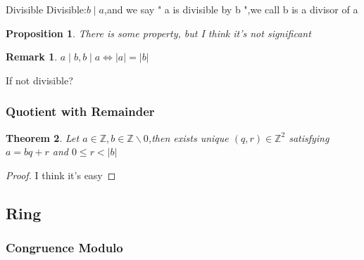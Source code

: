 \documentclass[13pt, a4paper, oneside]{book}
\newtheorem{theorem}{Theorem}[section]
\newtheorem{pro}[theorem]{Proposition}
\newtheorem{remark}{Remark}[section]
\begin{document}
	\begin{definition}{Divisible}{}
		Divisible:$b \mid a$,and we say " a is divisible by b ",we call b is a divisor of a
	\end{definition}
	
	\begin{pro}
		There is some property, but I think it's not significant
	\end{pro}
	
	\begin{remark}
		$a \mid b, b \mid a \Longleftrightarrow \left| a \right| = \left| b \right|$
	\end{remark}
	If not divisible?
	
	\subsubsection{Quotient with Remainder}
	
	\begin{theorem}
		Let $a \in \mathbb{Z}, b \in \mathbb{Z} \backslash {0}$,then exists unique $(q,r) \in \mathbb{Z}^2$ satisfying $a = bq+r$ and $0 \leq r < \left|b\right|$
	\end{theorem}
	
	\begin{proof}
		I think it's easy
	\end{proof}
	
	\newpage
	\subsection{Ring}
	
	\subsubsection{Congruence Modulo}
	
\end{document}
